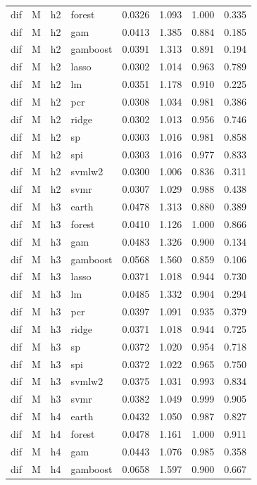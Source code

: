 \begin{ThreePartTable}
\begin{longtable}[t]{llclcccc}
dif & M & h2 & forest & 0.0326 & 1.093 & 1.000 & 0.335\\
dif & M & h2 & gam & 0.0413 & 1.385 & 0.884 & 0.185\\
dif & M & h2 & gamboost & 0.0391 & 1.313 & 0.891 & 0.194\\
dif & M & h2 & lasso & 0.0302 & 1.014 & 0.963 & 0.789\\
dif & M & h2 & lm & 0.0351 & 1.178 & 0.910 & 0.225\\
dif & M & h2 & pcr & 0.0308 & 1.034 & 0.981 & 0.386\\
dif & M & h2 & ridge & 0.0302 & 1.013 & 0.956 & 0.746\\
dif & M & h2 & sp & 0.0303 & 1.016 & 0.981 & 0.858\\
dif & M & h2 & spi & 0.0303 & 1.016 & 0.977 & 0.833\\
dif & M & h2 & svmlw2 & 0.0300 & 1.006 & 0.836 & 0.311\\
dif & M & h2 & svmr & 0.0307 & 1.029 & 0.988 & 0.438\\
\addlinespace
dif & M & h3 & earth & 0.0478 & 1.313 & 0.880 & 0.389\\
dif & M & h3 & forest & 0.0410 & 1.126 & 1.000 & 0.866\\
dif & M & h3 & gam & 0.0483 & 1.326 & 0.900 & 0.134\\
dif & M & h3 & gamboost & 0.0568 & 1.560 & 0.859 & 0.106\\
dif & M & h3 & lasso & 0.0371 & 1.018 & 0.944 & 0.730\\
dif & M & h3 & lm & 0.0485 & 1.332 & 0.904 & 0.294\\
dif & M & h3 & pcr & 0.0397 & 1.091 & 0.935 & 0.379\\
dif & M & h3 & ridge & 0.0371 & 1.018 & 0.944 & 0.725\\
dif & M & h3 & sp & 0.0372 & 1.020 & 0.954 & 0.718\\
dif & M & h3 & spi & 0.0372 & 1.022 & 0.965 & 0.750\\
dif & M & h3 & svmlw2 & 0.0375 & 1.031 & 0.993 & 0.834\\
dif & M & h3 & svmr & 0.0382 & 1.049 & 0.999 & 0.905\\
\addlinespace
dif & M & h4 & earth & 0.0432 & 1.050 & 0.987 & 0.827\\
dif & M & h4 & forest & 0.0478 & 1.161 & 1.000 & 0.911\\
dif & M & h4 & gam & 0.0443 & 1.076 & 0.985 & 0.358\\
dif & M & h4 & gamboost & 0.0658 & 1.597 & 0.900 & 0.667\\

\end{longtable}
\end{ThreePartTable}
